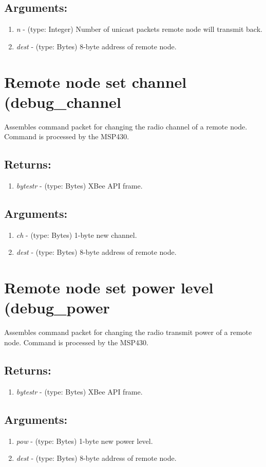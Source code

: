 \subsection{Arguments:}
\begin{enumerate}
\item \emph{n} - (type: Integer) Number of unicast packets remote node will transmit back.
\item \emph{dest} - (type: Bytes) 8-byte address of remote node.
\end{enumerate}

\section{Remote node set channel (debug\_channel}
Assembles command packet for changing the radio channel of a remote node. Command is processed by the MSP430.
\subsection{Returns:}
\begin{enumerate}
\item \emph{bytestr} - (type: Bytes) XBee API frame.
\end{enumerate}
\subsection{Arguments:}
\begin{enumerate}
\item \emph{ch} - (type: Bytes) 1-byte new channel.
\item \emph{dest} - (type: Bytes) 8-byte address of remote node.
\end{enumerate}

\section{Remote node set power level (debug\_power}
Assembles command packet for changing the radio transmit power of a remote node. Command is processed by the MSP430.
\subsection{Returns:}
\begin{enumerate}
\item \emph{bytestr} - (type: Bytes) XBee API frame.
\end{enumerate}
\subsection{Arguments:}
\begin{enumerate}
\item \emph{pow} - (type: Bytes) 1-byte new power level.
\item \emph{dest} - (type: Bytes) 8-byte address of remote node.
\end{enumerate}

